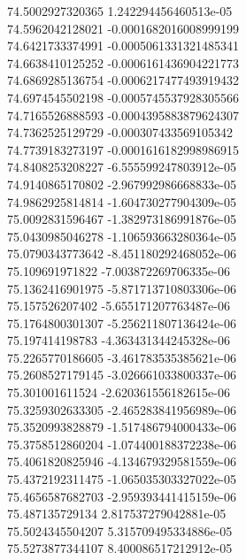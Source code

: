 {74.5002927320365 1.242294456460513e-05 \\
74.5962042128021 -0.0001682016008999199 \\
74.6421733374991 -0.0005061331321485341 \\
74.6638410125252 -0.0006161436904221773 \\
74.6869285136754 -0.0006217477493919432 \\
74.6974545502198 -0.0005745537928305566 \\
74.7165526888593 -0.0004395883879624307 \\
74.7362525129729 -0.000307433569105342 \\
74.7739183273197 -0.0001616182998986915 \\
74.8408253208227 -6.555599247803912e-05 \\
74.9140865170802 -2.967992986668833e-05 \\
74.9862925814814 -1.604730277904309e-05 \\
75.0092831596467 -1.382973186991876e-05 \\
75.0430985046278 -1.106593663280364e-05 \\
75.0790343773642 -8.451180292468052e-06 \\
75.109691971822 -7.003872269706335e-06 \\
75.1362416901975 -5.871713710803306e-06 \\
75.157526207402 -5.655171207763487e-06 \\
75.1764800301307 -5.256211807136424e-06 \\
75.197414198783 -4.363431344245328e-06 \\
75.2265770186605 -3.461783535385621e-06 \\
75.2608527179145 -3.026661033800337e-06 \\
75.301001611524 -2.620361556182615e-06 \\
75.3259302633305 -2.465283841956989e-06 \\
75.3520993828879 -1.517486794000433e-06 \\
75.3758512860204 -1.074400188372238e-06 \\
75.4061820825946 -4.134679329581559e-06 \\
75.4372192311475 -1.065035303327022e-05 \\
75.4656587682703 -2.959393441415159e-06 \\
75.487135729134 2.817537279042881e-05 \\
75.5024345504207 5.315709495334886e-05 \\
75.5273877344107 8.400086517212912e-05 \\
}
